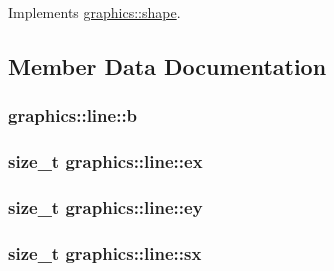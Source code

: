 Implements \hyperlink{classgraphics_1_1shape_a948bd22d258ce2122b81c7385a315596}{graphics\+::shape}.



\subsection{Member Data Documentation}
\subsubsection[{\texorpdfstring{b}{b}}]{ graphics\+::line\+::b\hspace{0.3cm}{\ttfamily [private]}}\hypertarget{classgraphics_1_1line_ab8b7e54fde92e99de480b3ce9d8a167f}{}\label{classgraphics_1_1line_ab8b7e54fde92e99de480b3ce9d8a167f}
\subsubsection[{\texorpdfstring{ex}{ex}}]{\setlength{\rightskip}{0pt plus 5cm}size\+\_\+t graphics\+::line\+::ex\hspace{0.3cm}{\ttfamily [private]}}\hypertarget{classgraphics_1_1line_ac3cc564cf12b6001ff01569dd46074a1}{}\label{classgraphics_1_1line_ac3cc564cf12b6001ff01569dd46074a1}
\subsubsection[{\texorpdfstring{ey}{ey}}]{\setlength{\rightskip}{0pt plus 5cm}size\+\_\+t graphics\+::line\+::ey\hspace{0.3cm}{\ttfamily [private]}}\hypertarget{classgraphics_1_1line_a3ec687141bc383f58256cd3e4f614b55}{}\label{classgraphics_1_1line_a3ec687141bc383f58256cd3e4f614b55}
\subsubsection[{\texorpdfstring{sx}{sx}}]{\setlength{\rightskip}{0pt plus 5cm}size\+\_\+t graphics\+::line\+::sx\hspace{0.3cm}{\ttfamily [private]}}\hypertarget{classgraphics_1_1line_a9f017c004983fbfa5c21d88b8b29d5de}{}\label{classgraphics_1_1line_a9f017c004983fbfa5c21d88b8b29d5de}
